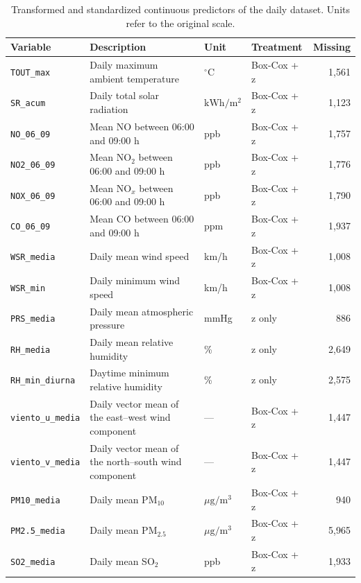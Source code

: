 \begin{table}[pos=t]
  \centering
  \caption{Transformed and standardized continuous predictors of the daily
    dataset. Units refer to the original scale.}
  \label{tab:dic-diario-continuas}
  \footnotesize
  \setlength{\tabcolsep}{4pt}
  \begin{tabular}{lp{7.2cm}llr}
    \toprule
    Variable & Description & Unit & Treatment & Missing \\
    \midrule
    \texttt{TOUT\_max} & Daily maximum ambient temperature
      & $^{\circ}\mathrm{C}$ & Box-Cox + z & 1,561 \\
    \texttt{SR\_acum} & Daily total solar radiation
      & $\mathrm{kWh}/\mathrm{m}^{2}$ & Box-Cox + z & 1,123 \\
    \texttt{NO\_06\_09} & Mean NO between 06:00 and 09:00 h
      & ppb & Box-Cox + z & 1,757 \\
    \texttt{NO2\_06\_09} & Mean NO$_2$ between 06:00 and 09:00 h
      & ppb & Box-Cox + z & 1,776 \\
    \texttt{NOX\_06\_09} & Mean NO$_x$ between 06:00 and 09:00 h
      & ppb & Box-Cox + z & 1,790 \\
    \texttt{CO\_06\_09} & Mean CO between 06:00 and 09:00 h
      & ppm & Box-Cox + z & 1,937 \\
    \texttt{WSR\_media} & Daily mean wind speed
      & km/h & Box-Cox + z & 1,008 \\
    \texttt{WSR\_min} & Daily minimum wind speed
      & km/h & Box-Cox + z & 1,008 \\
    \texttt{PRS\_media} & Daily mean atmospheric pressure
      & mmHg & z only & 886 \\
    \texttt{RH\_media} & Daily mean relative humidity
      & \% & z only & 2,649 \\
    \texttt{RH\_min\_diurna} & Daytime minimum relative humidity
      & \% & z only & 2,575 \\
    \texttt{viento\_u\_media} & Daily vector mean of the east--west wind
      component & --- & Box-Cox + z & 1,447 \\
    \texttt{viento\_v\_media} & Daily vector mean of the north--south wind
      component & --- & Box-Cox + z & 1,447 \\
    \texttt{PM10\_media} & Daily mean PM$_{10}$
      & $\mu\mathrm{g}/\mathrm{m}^{3}$ & Box-Cox + z & 940 \\
    \texttt{PM2.5\_media} & Daily mean PM$_{2.5}$
      & $\mu\mathrm{g}/\mathrm{m}^{3}$ & Box-Cox + z & 5,965 \\
    \texttt{SO2\_media} & Daily mean SO$_2$
      & ppb & Box-Cox + z & 1,933 \\
    \bottomrule
  \end{tabular}
\end{table}

